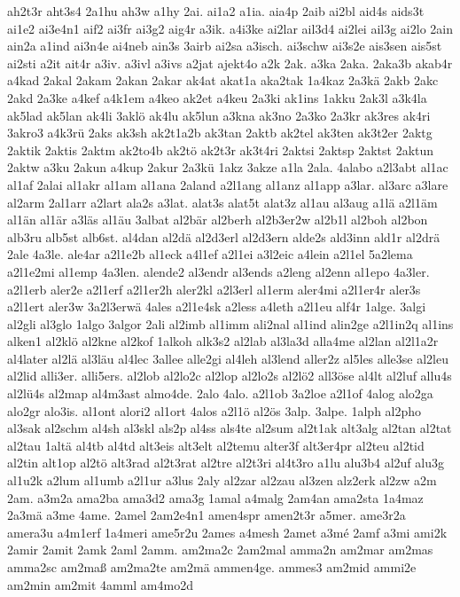 {ah2t3r
aht3s4
2a1hu
ah3w
a1hy
2ai.
ai1a2
a1ia.
aia4p
2aib
ai2bl
aid4s
aids3t
ai1e2
ai3e4n1
aif2
ai3fr
ai3g2
aig4r
a3ik.
a4i3ke
ai2lar
ail3d4
ai2lei
ail3g
ai2lo
2ain
ain2a
a1ind
ai3n4e
ai4neb
ain3s
3airb
ai2sa
a3isch.
ai3schw
ai3s2e
ais3sen
ais5st
ai2sti
a2it
ait4r
a3iv.
a3ivl
a3ivs
a2jat
ajekt4o
a2k
2ak.
a3ka
2aka.
2aka3b
akab4r
a4kad
2akal
2akam
2akan
2akar
ak4at
akat1a
aka2tak
1a4kaz
2a3kä
2akb
2akc
2akd
2a3ke
a4kef
a4k1em
a4keo
ak2et
a4keu
2a3ki
ak1ins
1akku
2ak3l
a3k4la
ak5lad
ak5lan
ak4li
3aklö
ak4lu
ak5lun
a3kna
ak3no
2a3ko
2a3kr
ak3res
ak4ri
3akro3
a4k3rü
2aks
ak3sh
ak2t1a2b
ak3tan
2aktb
ak2tel
ak3ten
ak3t2er
2aktg
2aktik
2aktis
2aktm
ak2to4b
ak2tö
ak2t3r
ak3t4ri
2aktsi
2aktsp
2aktst
2aktun
2aktw
a3ku
2akun
a4kup
2akur
2a3kü
1akz
3akze
a1la
2ala.
4alabo
a2l3abt
al1ac
al1af
2alai
al1akr
al1am
al1ana
2aland
a2l1ang
al1anz
al1app
a3lar.
al3arc
a3lare
al2arm
2al1arr
a2lart
ala2s
a3lat.
alat3s
alat5t
alat3z
al1au
al3aug
a1lä
a2l1äm
al1än
al1är
a3läs
al1äu
3albat
al2bär
al2berh
al2b3er2w
al2b1l
al2boh
al2bon
alb3ru
alb5st
alb6st.
al4dan
al2dä
al2d3erl
al2d3ern
alde2s
ald3inn
ald1r
al2drä
2ale
4a3le.
ale4ar
a2l1e2b
al1eck
a4l1ef
a2l1ei
a3l2eic
a4lein
a2l1el
5a2lema
a2l1e2mi
al1emp
4a3len.
alende2
al3endr
al3ends
a2leng
al2enn
al1epo
4a3ler.
a2l1erb
aler2e
a2l1erf
a2l1er2h
aler2kl
a2l3erl
al1erm
aler4mi
a2l1er4r
aler3s
a2l1ert
aler3w
3a2l3erwä
4ales
a2l1e4sk
a2less
a4leth
a2l1eu
alf4r
1alge.
3algi
al2gli
al3glo
1algo
3algor
2ali
al2imb
al1imm
ali2nal
al1ind
alin2ge
a2l1in2q
al1ins
alken1
al2klö
al2kne
al2kof
1alkoh
alk3s2
al2lab
al3la3d
alla4me
al2lan
al2l1a2r
al4later
al2lä
al3läu
al4lec
3allee
alle2gi
al4leh
al3lend
aller2z
al5les
alle3se
al2leu
al2lid
alli3er.
alli5ers.
al2lob
al2lo2c
al2lop
al2lo2s
al2lö2
all3öse
al4lt
al2luf
allu4s
al2lü4s
al2map
al4m3ast
almo4de.
2alo
4alo.
a2l1ob
3a2loe
a2l1of
4alog
alo2ga
alo2gr
alo3is.
al1ont
alori2
al1ort
4alos
a2l1ö
al2ös
3alp.
3alpe.
1alph
al2pho
al3sak
al2schm
al4sh
al3skl
als2p
al4ss
als4te
al2sum
al2t1ak
alt3alg
al2tan
al2tat
al2tau
1altä
al4tb
al4td
alt3eis
alt3elt
al2temu
alter3f
alt3er4pr
al2teu
al2tid
al2tin
alt1op
al2tö
alt3rad
al2t3rat
al2tre
al2t3ri
al4t3ro
a1lu
alu3b4
al2uf
alu3g
al1u2k
a2lum
al1umb
a2l1ur
a3lus
2aly
al2zar
al2zau
al3zen
alz2erk
al2zw
a2m
2am.
a3m2a
ama2ba
ama3d2
ama3g
1amal
a4malg
2am4an
ama2sta
1a4maz
2a3mä
a3me
4ame.
2amel
2am2e4n1
amen4spr
amen2t3r
a5mer.
ame3r2a
amera3u
a4m1erf
1a4meri
ame5r2u
2ames
a4mesh
2amet
a3mé
2amf
a3mi
ami2k
2amir
2amit
2amk
2aml
2amm.
am2ma2c
2am2mal
amma2n
am2mar
am2mas
amma2sc
am2maß
am2ma2te
am2mä
ammen4ge.
ammes3
am2mid
ammi2e
am2min
am2mit
4amml
am4mo2d
}

